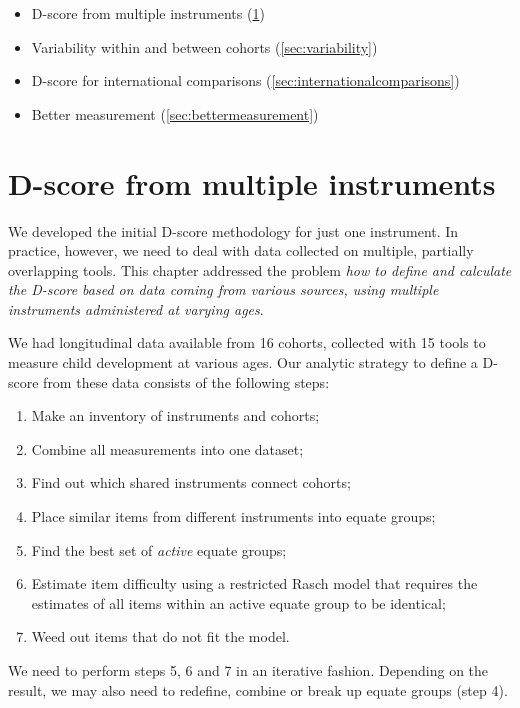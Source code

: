 \documentclass[
]{book}
\providecommand{\tightlist}{%
  \setlength{\itemsep}{0pt}\setlength{\parskip}{0pt}}
\begin{document}
\begin{itemize}
\tightlist
\item
  D-score from multiple instruments (\ref{sec:multipleinstruments})
\item
  Variability within and between cohorts (\ref{sec:variability})
\item
  D-score for international comparisons (\ref{sec:internationalcomparisons})
\item
  Better measurement (\ref{sec:bettermeasurement})
\end{itemize}

\hypertarget{sec:multipleinstruments}{%
\section{D-score from multiple instruments}\label{sec:multipleinstruments}}

We developed the initial D-score methodology for just one instrument. In practice, however, we need to deal with data collected on multiple, partially overlapping tools. This chapter addressed the problem \emph{how to define and calculate the D-score based on data coming from various sources, using multiple instruments administered at varying ages}.

We had longitudinal data available from 16 cohorts, collected with 15 tools to measure child development at various ages. Our analytic strategy to define a D-score from these data consists of the following steps:

\begin{enumerate}
\def\labelenumi{\arabic{enumi}.}
\tightlist
\item
  Make an inventory of instruments and cohorts;
\item
  Combine all measurements into one dataset;
\item
  Find out which shared instruments connect cohorts;
\item
  Place similar items from different instruments into equate groups;
\item
  Find the best set of \emph{active} equate groups;
\item
  Estimate item difficulty using a restricted Rasch model that requires the estimates of all items within an active equate group to be identical;
\item
  Weed out items that do not fit the model.
\end{enumerate}

We need to perform steps 5, 6 and 7 in an iterative fashion. Depending on the result, we may also need to redefine, combine or break up equate groups (step 4).
\end{document}

